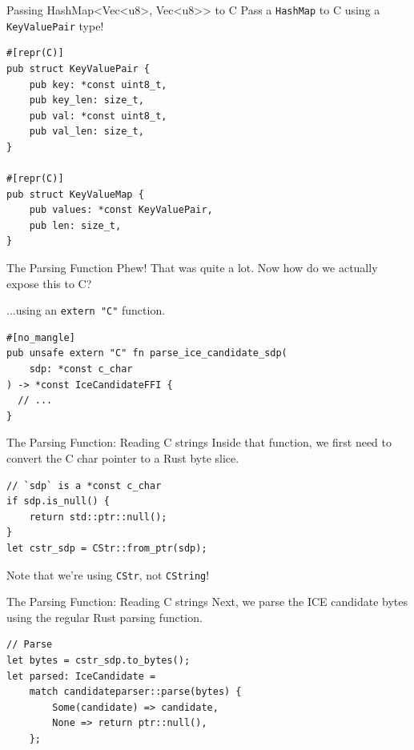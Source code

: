 \documentclass[aspectratio=1610,14pt,t]{beamer}
\begin{document}
\begin{frame}[c,fragile]{Passing HashMap<Vec<u8>, Vec<u8>{}> to C}
  Pass a \texttt{HashMap} to C using a \texttt{KeyValuePair} type!

  \begin{verbatim}
#[repr(C)]
pub struct KeyValuePair {
    pub key: *const uint8_t,
    pub key_len: size_t,
    pub val: *const uint8_t,
    pub val_len: size_t,
}

#[repr(C)]
pub struct KeyValueMap {
    pub values: *const KeyValuePair,
    pub len: size_t,
}
  \end{verbatim}
\end{frame}

\begin{frame}[c,fragile]{The Parsing Function}
  Phew! That was quite a lot. Now how do we actually expose this to C?

  ...using an \texttt{extern "C"} function.

  \begin{verbatim}
#[no_mangle]
pub unsafe extern "C" fn parse_ice_candidate_sdp(
    sdp: *const c_char
) -> *const IceCandidateFFI {
  // ...
}
  \end{verbatim}
\end{frame}

\begin{frame}[c,fragile]{The Parsing Function: Reading C strings}
  Inside that function, we first need to convert the C char pointer to a Rust
  byte slice.

  \begin{verbatim}
// `sdp` is a *const c_char
if sdp.is_null() {
    return std::ptr::null();
}
let cstr_sdp = CStr::from_ptr(sdp);
  \end{verbatim}

Note that we're using \texttt{CStr}, not \texttt{CString}!
\end{frame}

\begin{frame}[c,fragile]{The Parsing Function: Reading C strings}
Next, we parse the ICE candidate bytes using the regular Rust parsing function.

  \begin{verbatim}
// Parse
let bytes = cstr_sdp.to_bytes();
let parsed: IceCandidate =
    match candidateparser::parse(bytes) {
        Some(candidate) => candidate,
        None => return ptr::null(),
    };
  \end{verbatim}
\end{frame}
\end{document}
